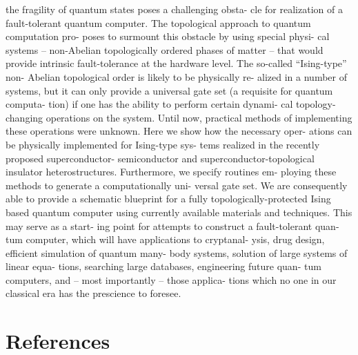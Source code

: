 \documentclass[preprint, 5p, 10pt]{elsarticle}
\theoremstyle{plain}
\begin{document}
the fragility of quantum states poses a challenging obsta-
cle for realization of a fault-tolerant quantum computer.
The topological approach to quantum computation pro-
poses to surmount this obstacle by using special physi-
cal systems – non-Abelian topologically ordered phases
of matter – that would provide intrinsic fault-tolerance
at the hardware level. The so-called “Ising-type” non-
Abelian topological order is likely to be physically re-
alized in a number of systems, but it can only provide
a universal gate set (a requisite for quantum computa-
tion) if one has the ability to perform certain dynami-
cal topology-changing operations on the system. Until
now, practical methods of implementing these operations
were unknown. Here we show how the necessary oper-
ations can be physically implemented for Ising-type sys-
tems realized in the recently proposed superconductor-
semiconductor and superconductor-topological insulator
heterostructures. Furthermore, we specify routines em-
ploying these methods to generate a computationally uni-
versal gate set. We are consequently able to provide
a schematic blueprint for a fully topologically-protected
Ising based quantum computer using currently available
materials and techniques. This may serve as a start-
ing point for attempts to construct a fault-tolerant quan-
tum computer, which will have applications to cryptanal-
ysis, drug design, efficient simulation of quantum many-
body systems, solution of large systems of linear equa-
tions, searching large databases, engineering future quan-
tum computers, and – most importantly – those applica-
tions which no one in our classical era has the prescience
to foresee.

\newpage
\section{References}

 
\end{document}
